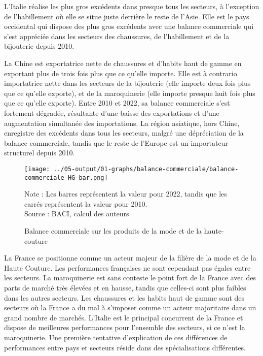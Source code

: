 \documentclass[french,10pt,a4paper]{article}
\begin{document}
L'Italie réalise les plus gros excédents dans presque tous les secteurs, à l'exception de l'habillement où elle se situe juste derrière le reste de l'Asie. Elle est le pays occidental qui dispose des plus gros excédents avec une balance commerciale qui s'est appréciée dans les secteurs des chaussures, de l'habillement et de la bijouterie depuis 2010.

La Chine est exportatrice nette de chaussures et d'habits haut de gamme en exportant plus de trois fois plus que ce qu'elle importe. Elle est à contrario importatrice nette dans les secteurs de la bijouterie (elle importe deux fois plus que ce qu'elle exporte), et de la maroquinerie (elle importe presque huit fois plus que ce qu'elle exporte). Entre 2010 et 2022, sa balance commerciale s'est fortement dégradée, résultante d'une baisse des exportations et d'une augmentation simultanée des importations. La région asiatique, hors Chine, enregistre des excédents dans tous les secteurs, malgré une dépréciation de la balance commerciale, tandis que le reste de l'Europe est un importateur structurel depuis 2010.

\begin{figure}[!h]
  \centering
  \texttt{[image: ../05-output/01-graphs/balance-commerciale/balance-commerciale-HG-bar.png]}
  \captionsetup{justification=justified, singlelinecheck=false, font=small}
  \caption*{Note : Les barres représentent la valeur pour 2022, tandis que les carrés représentent la valeur pour 2010. \\
  Source : BACI, calcul des auteurs}
  \captionsetup{justification=centering, singlelinecheck=true, font=normalsize}
  \caption{Balance commerciale sur les produits de la mode et de la haute-couture}
  \label{fig:balance-commerciale}
\end{figure}

\bigskip

La France se positionne comme un acteur majeur de la filière de la mode et de la Haute Couture. Les performances françaises ne sont cependant pas égales entre les secteurs. La maroquinerie est sans conteste le point fort de la France avec des parts de marché très élevées et en hausse, tandis que celles-ci sont plus faibles dans les autres secteurs. Les chaussures et les habits haut de gamme sont des secteurs où la France a du mal à s'imposer comme un acteur majoritaire dans un grand nombre de marchés. L'Italie est le principal concurrent de la France et dispose de meilleures performances pour l'ensemble des secteurs, si ce n'est la maroquinerie. Une première tentative d'explication de ces différences de performances entre pays et secteurs réside dans des spécialisations différentes.
\end{document}
